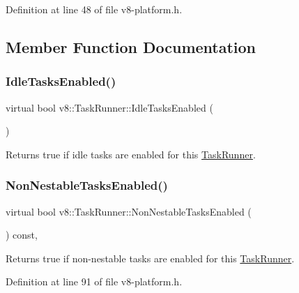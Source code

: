 Definition at line 48 of file v8-\/platform.\+h.



\subsection{Member Function Documentation}
\mbox{\label{classv8_1_1TaskRunner_aa8a6077bed5735e2190918685faf20f5}} 
\subsubsection{\texorpdfstring{Idle\+Tasks\+Enabled()}{IdleTasksEnabled()}}
{\footnotesize\ttfamily virtual bool v8\+::\+Task\+Runner\+::\+Idle\+Tasks\+Enabled (\begin{DoxyParamCaption}{ }\end{DoxyParamCaption})\hspace{0.3cm}{\ttfamily [pure virtual]}}

Returns true if idle tasks are enabled for this \mbox{\hyperlink{classv8_1_1TaskRunner}{Task\+Runner}}. \mbox{\label{classv8_1_1TaskRunner_a7042a9967ddaaf1f995e568c3dd7ce64}} 
\subsubsection{\texorpdfstring{Non\+Nestable\+Tasks\+Enabled()}{NonNestableTasksEnabled()}}
{\footnotesize\ttfamily virtual bool v8\+::\+Task\+Runner\+::\+Non\+Nestable\+Tasks\+Enabled (\begin{DoxyParamCaption}{ }\end{DoxyParamCaption}) const\hspace{0.3cm}{\ttfamily [inline]}, {\ttfamily [virtual]}}

Returns true if non-\/nestable tasks are enabled for this \mbox{\hyperlink{classv8_1_1TaskRunner}{Task\+Runner}}. 

Definition at line 91 of file v8-\/platform.\+h.

\mbox{\label{classv8_1_1TaskRunner_a8ae45842086210292d966e2e326629a4}} 
